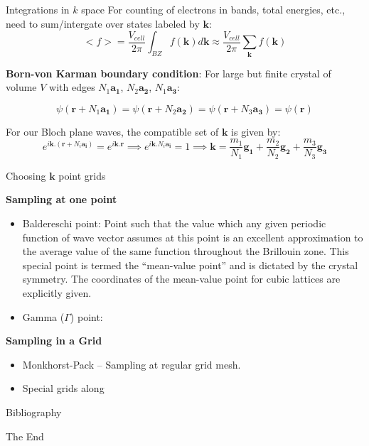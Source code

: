 \documentclass[aspectratio=169]{beamer}
\let \vec \mathbf
\begin{document}
\begin{frame}{Integrations in $k$ space}
For counting of electrons in bands, total energies, etc., need to sum/intergate over states labeled by $\vec{k}$:
\begin{equation*}
<f> = \frac{V_{cell}}{2\pi} \int_{BZ} f(\vec{k}) d\vec{k} \approx \frac{V_{cell}}{2\pi} \sum_{\vec{k}} f(\vec{k})
\end{equation*} 

\textbf{Born-von Karman boundary condition}: For large but finite crystal of volume $V$ with edges $N_1 \vec{a_1}$, $N_2 \vec{a_2}$, $N_1 \vec{a_3}$:

\begin{equation*}
\psi(\vec{r} + N_1 \vec{a_1}) = \psi(\vec{r} + N_2 \vec{a_2}) = \psi(\vec{r} + N_3 \vec{a_3}) = \psi(\vec{r})
\end{equation*} 

For our Bloch plane waves, the compatible set of $\vec{k}$ is given by:
\begin{equation*}
e^{i\vec{k}.(\vec{r} + N_i \vec{a_i})} = e^{i\vec{k}.\vec{r}}\implies e^{i\vec{k}.N_i \vec{a_i}} = 1 \implies \vec{k} = \frac{m_1}{N_1} \vec{g_1} +  \frac{m_2}{N_2} \vec{g_2} +\frac{m_3}{N_3} \vec{g_3}
\end{equation*} 

\end{frame} 


\begin{frame}{Choosing $\vec{k}$ point grids}

\textbf{Sampling at one point}
\begin{itemize}
    \item Baldereschi point: Point such that the value which any given periodic function of wave vector assumes at this point is an excellent approximation to the average value of the same function throughout the Brillouin zone. This special point is termed the ``mean-value point'' and is dictated by the crystal symmetry. The coordinates of the mean-value point for cubic lattices are explicitly given.
    \item Gamma ($\Gamma$) point: 
\end{itemize}

\textbf{Sampling in a Grid}
\begin{itemize}
    \item Monkhorst-Pack – Sampling at regular grid mesh.
    \item Special grids along 
\end{itemize}

\end{frame} 



    \begin{frame}[allowframebreaks]{Bibliography}
        
        
    \end{frame}



    \begin{frame}
        \Huge{\centerline{The End}}
    \end{frame}
\end{document}
